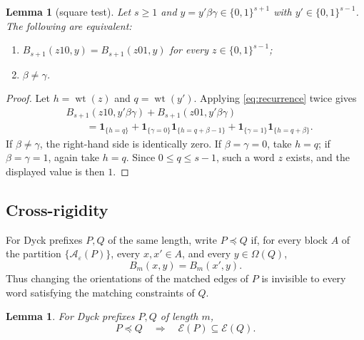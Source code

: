 \documentclass[11pt]{article}
\newtheorem{lemma}[theorem]{Lemma}
\theoremstyle{definition}
\newcommand{\wt}{\operatorname{wt}}
\newcommand{\ind}[1]{\mathbf 1_{\{#1\}}}
\newcommand{\A}{\mathcal A}
\newcommand{\E}{\mathcal E}
\newcommand{\Om}{\Omega}
\newcommand{\bits}{\{0,1\}}
\newcommand{\eps}{\varepsilon}
\begin{document}
\begin{lemma}[square test]\label{lem:square}
Let $s\ge1$ and $y=y'\beta\gamma\in\bits^{s+1}$ with $y'\in\bits^{s-1}$.  The following are equivalent:
\begin{enumerate}[label=(\roman*)]
 \item $B_{s+1}(z10,y)=B_{s+1}(z01,y)$ for every $z\in\bits^{s-1}$;
 \item $\beta\ne\gamma$.
\end{enumerate}
\end{lemma}

\begin{proof}
Let $h=\wt(z)$ and $q=\wt(y')$.  Applying \eqref{eq:recurrence} twice gives
\begin{align*}
&B_{s+1}(z10,y'\beta\gamma)+B_{s+1}(z01,y'\beta\gamma)\\
&\qquad=
 \ind{h=q}
 +\ind{\gamma=0}\ind{h=q+\beta-1}
 +\ind{\gamma=1}\ind{h=q+\beta}.
\end{align*}
If $\beta\ne\gamma$, the right-hand side is identically zero.  If $\beta=\gamma=0$, take $h=q$; if $\beta=\gamma=1$, again take $h=q$.  Since $0\le q\le s-1$, such a word $z$ exists, and the displayed value is then $1$.
\end{proof}

\subsection{Cross-rigidity}

For Dyck prefixes $P,Q$ of the same length, write $P\preccurlyeq Q$ if, for every block $A$ of the partition $\{\A_{\eps}(P)\}$, every $x,x'\in A$, and every $y\in\Om(Q)$,
\begin{equation}\label{eq:preceq}
 B_m(x,y)=B_m(x',y).
\end{equation}
Thus changing the orientations of the matched edges of $P$ is invisible to every word satisfying the matching constraints of $Q$.

\begin{lemma}\label{lem:oneway}
For Dyck prefixes $P,Q$ of length $m$,
\[
 P\preccurlyeq Q \quad\Longrightarrow\quad \E(P)\subseteq\E(Q).
\]
\end{lemma}
\end{document}
